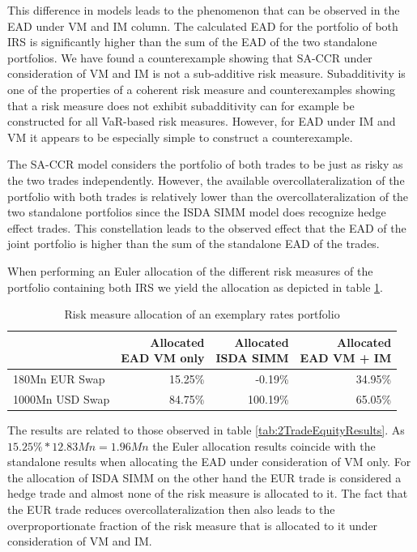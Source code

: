 \documentclass[../Thesis_AHoecherl.tex]{subfiles}
\begin{document}
    This difference in models leads to the phenomenon that can be observed in the \gls{EAD} under \gls{VM} and \gls{IM} column. The calculated \gls{EAD} for the portfolio of both \gls{IRS} is significantly higher than the sum of the \gls{EAD} of the two standalone portfolios.
    We have found a counterexample showing that \gls{SA-CCR} under consideration of \gls{VM} and \gls{IM} is not a sub-additive risk measure.
    Subadditivity is one of the properties of a coherent risk measure and counterexamples showing that a risk measure does not exhibit subadditivity can for example be constructed for all \gls{VaR}-based risk measures. However, for \gls{EAD} under \gls{IM} and \gls{VM} it appears to be especially simple to construct a counterexample.

    The \gls{SA-CCR} model considers the portfolio of both trades to be just as risky as the two trades independently. However, the available overcollateralization of the portfolio with both trades is relatively lower than the overcollateralization of the two standalone portfolios since the \gls{ISDA SIMM} model does recognize hedge effect trades. This constellation leads to the observed effect that the \gls{EAD} of the joint portfolio is higher than the sum of the standalone \gls{EAD} of the trades.

    When performing an Euler allocation of the different risk measures of the portfolio containing both \gls{IRS} we yield the allocation as depicted in table \ref{tab:2TradeRatesAllocation}.

    \begin{table}[htbp]
        \centering
        \begin{tabular}{l||r|r|r}
                & \makecell{Allocated \\ \gls{EAD} \gls{VM} only} & \makecell{Allocated \\ \gls{ISDA SIMM}} & \makecell{Allocated \\ \gls{EAD} \gls{VM} + IM} \\
                \toprule
        180Mn EUR Swap & 15.25\% & -0.19\% & 34.95\% \\
        1000Mn USD Swap & 84.75\% & 100.19\% & 65.05\% \\
        \end{tabular}%
        \caption{Risk measure allocation of an exemplary rates portfolio}
        \label{tab:2TradeRatesAllocation}%
    \end{table}%
    
    The results are related to those observed in table \ref{tab:2TradeEquityResults}. As $15.25\% * 12.83Mn = 1.96Mn$ the Euler allocation results coincide with the standalone results when allocating the \gls{EAD} under consideration of \gls{VM} only. 
    For the allocation of \gls{ISDA SIMM} on the other hand the EUR trade is considered a hedge trade and almost none of the risk measure is allocated to it. 
    The fact that the EUR trade reduces overcollateralization then also leads to the overproportionate fraction of the risk measure that is allocated to it under consideration of \gls{VM} and IM.
    
\end{document}
